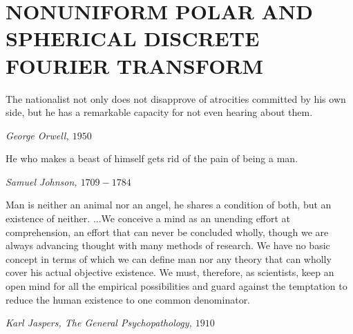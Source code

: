 \documentclass{UCF_ETD}
\begin{document}




\chapter{NONUNIFORM POLAR AND SPHERICAL DISCRETE FOURIER TRANSFORM} \label{PolarPaper}

\epigraph{The nationalist not only does not disapprove of atrocities committed by his own side, 
but he has a remarkable capacity for not even hearing about them.}{\itshape George Orwell, $1950$}

\epigraph{He who makes a beast of himself gets rid of the pain of being a man.}{\itshape Samuel Johnson, $1709 - 1784$}

\epigraph{Man is neither an animal nor an angel,  
he shares a condition of both, 
but an existence of neither. ...We conceive a mind as an unending effort at comprehension, 
an effort that can never be concluded wholly, 
though we are always advancing thought with many methods of research. We have no basic concept in terms of which we can define man 
nor any theory that can wholly cover his actual objective existence. 
We must, therefore, as scientists, keep  an open mind for all 
the empirical possibilities and guard against the temptation 
to reduce the human existence to one common denominator.}{\itshape Karl Jaspers, The General Psychopathology, $1910$}
\end{document}
